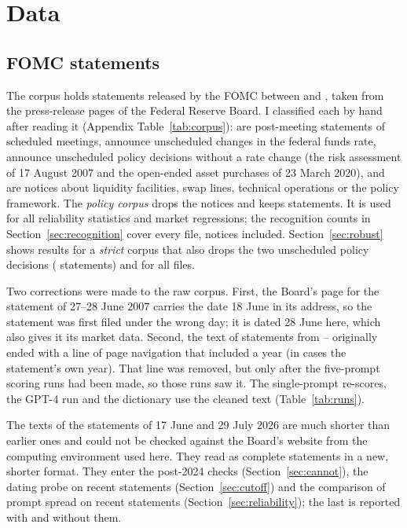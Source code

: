 \section{Data}\label{sec:data}

\subsection{FOMC statements}

The corpus holds  statements released by the FOMC between  and
, taken from the press-release pages of the Federal Reserve Board. I classified each by
hand after reading it (Appendix Table~\ref{tab:corpus}):  are post-meeting statements
of scheduled meetings,  announce unscheduled changes in the federal funds rate,
 announce unscheduled policy decisions without a rate change (the risk
assessment of 17 August 2007 and the open-ended asset purchases of 23 March 2020), and
 are notices about liquidity facilities, swap lines, technical operations or the
policy framework. The \emph{policy corpus} drops the notices and keeps 
statements. It is used for all reliability statistics and market regressions; the recognition counts in
Section~\ref{sec:recognition} cover every file, notices included. Section~\ref{sec:robust} shows results for a \emph{strict} corpus that
also drops the two unscheduled policy decisions ( statements) and for all
 files.

Two corrections were made to the raw corpus. First, the Board's page for the statement of 27--28 June
2007 carries the date 18 June in its address, so the statement was first filed under the wrong day; it
is dated 28 June here, which also gives it its market data. Second, the text of  statements from
-- originally ended with a line of page navigation that included a year (in
 cases the statement's own year). That line was removed, but only after the five-prompt scoring
runs had been made, so those runs saw it. The single-prompt re-scores, the GPT-4 run and the dictionary
use the cleaned text (Table~\ref{tab:runs}).

The texts of the statements of 17 June and 29 July 2026 are much shorter than earlier ones and could not
be checked against the Board's website from the computing environment used here. They read as complete
statements in a new, shorter format. They enter the post-2024 checks (Section~\ref{sec:cannot}), the
dating probe on recent statements (Section~\ref{sec:cutoff}) and the comparison of prompt spread on
recent statements (Section~\ref{sec:reliability}); the last is reported with and without them.

